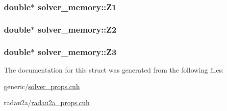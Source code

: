 \subsubsection[{\texorpdfstring{Z1}{Z1}}]{\setlength{\rightskip}{0pt plus 5cm}double$\ast$ solver\+\_\+memory\+::\+Z1}\hypertarget{structsolver__memory_aa494e688ee8d9516ffe48e4f26bb9455}{}\label{structsolver__memory_aa494e688ee8d9516ffe48e4f26bb9455}
\subsubsection[{\texorpdfstring{Z2}{Z2}}]{\setlength{\rightskip}{0pt plus 5cm}double$\ast$ solver\+\_\+memory\+::\+Z2}\hypertarget{structsolver__memory_a2450435b9370ebf22d87f51f7b18c629}{}\label{structsolver__memory_a2450435b9370ebf22d87f51f7b18c629}
\subsubsection[{\texorpdfstring{Z3}{Z3}}]{\setlength{\rightskip}{0pt plus 5cm}double$\ast$ solver\+\_\+memory\+::\+Z3}\hypertarget{structsolver__memory_a3f13b379ba1ecb183bf9f22c2ef3f23c}{}\label{structsolver__memory_a3f13b379ba1ecb183bf9f22c2ef3f23c}


The documentation for this struct was generated from the following files\+:\begin{DoxyCompactItemize}
\item 
generic/\hyperlink{solver__props_8cuh}{solver\+\_\+props.\+cuh}\item 
radau2a/\hyperlink{radau2a__props_8cuh}{radau2a\+\_\+props.\+cuh}\end{DoxyCompactItemize}
